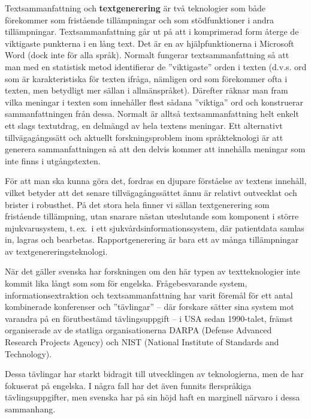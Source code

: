 \begin{multicols}{2}
Textsammanfattning och \textbf{textgenerering} är två teknologier som
både förekommer som fristående tillämpningar och som stödfunktioner i
andra tillämpningar. Textsammanfattning går ut på att i komprimerad
form återge de viktigaste punkterna i en lång text. Det är en av
hjälpfunktionerna i Microsoft Word (dock inte för alla språk). Normalt
fungerar textsammanfattning så att man med en statistisk metod
identifierar de ''viktigaste'' orden i texten (d.v.s. ord som är
karakteristiska för texten ifråga, nämligen ord som förekommer ofta i
texten, men betydligt mer sällan i allmänspråket). Därefter räknar man
fram vilka meningar i texten som innehåller flest sådana ''viktiga''
ord och konstruerar sammanfattningen från dessa. Normalt är alltså
textsammanfattning helt enkelt ett slags textutdrag, en delmängd av
hela textens meningar. Ett alternativt tillvägagångssätt och aktuellt
forskningsproblem inom språkteknologi är att generera sammanfattningen
så att den delvis kommer att innehålla meningar som inte finns i
utgångstexten.


För att man ska kunna göra det, fordras en djupare förståelse av
textens innehåll, vilket betyder att det senare tillvägagångssättet
ännu är relativt outvecklat och brister i robusthet. På det stora hela
finner vi sällan textgenerering som fristående tillämpning, utan
snarare nästan uteslutande som komponent i större mjukvarusystem,
t.\,ex.~i ett sjuk\-vårds\-informa\-tions\-system, där patient\-data
samlas in, lagras och bearbetas. Rapport\-generering är bara ett av
många tillämpningar av text\-genererings\-tekno\-logi.

När det gäller svenska har forskningen om den här typen av
textteknologier inte kommit lika långt som som för
engelska. Frågebesvarande system, informationsextraktion och
textsammanfattning har varit föremål för ett antal kombinerade
konferenser och ''tävlingar'' -- där forskare sätter sina system mot
varandra på en förutbestämd tävlingsuppgift -- i USA sedan 1990-talet,
främst organiserade av de statliga organisationerna
DARPA (Defense Advanced Research Projects Agency) och
NIST (National Institute of Standards and Technology). 

Dessa
tävlingar har starkt bidragit till utvecklingen av teknologierna, men
de har fokuserat på engelska. I några fall har det även funnits
flerspråkiga tävlingsuppgifter, men svenska har på sin höjd haft en
marginell närvaro i dessa sammanhang. 


\end{multicols}
